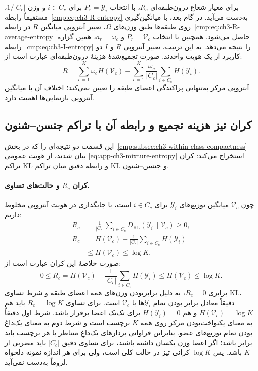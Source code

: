 برای معیار شعاع درون‌طبقه‌ای $R_c$، با انتخاب $P_r=\mathscr Y_i$ برای $i\in C_c$ و وزن $1/|C_c|$، مستقیماً رابطه~\eqref{cmp:eq:ch3-R-entropy} به‌دست می‌آید. در گام بعد، با میانگین‌گیری روی طبقه‌ها طبق وزن‌های $\Omega$، تعبیر آنتروپی میانگین $R$ در رابطه~\eqref{cmp:eq:ch3-R-average-entropy} حاصل می‌شود. همچنین با انتخاب $P_r=\mathcal V_c$ و $a_r=\omega_c$، همین گزاره رابطه~\eqref{cmp:eq:ch3-I-entropy} را نتیجه می‌دهد. به این ترتیب، تعبیر آنتروپی $R$ و $I$ دو کاربرد از یک هویت واحدند. صورت تجمیع‌شدهٔ هزینهٔ درون‌طبقه‌ای عبارت است از:
\begin{equation}\label{cmp:eq:ch3-R-average-entropy}
\boxed{R=\sum_{c=1}^{K}\omega_c H(\mathcal V_c)
-\sum_{c=1}^{K}\frac{\omega_c}{|C_c|}
\sum_{i\in C_c}H(\mathscr Y_i).}
\end{equation}
آنتروپی مرکز به‌تنهایی پراکندگی اعضای طبقه را تعیین نمی‌کند؛ اختلاف آن با میانگین آنتروپی بازنمایی‌ها اهمیت دارد.

\subsection{کران تیز هزینه تجمیع و رابطه آن با تراکم جنسن--شنون}
\label{app:ch3-compactness-entropy-relations}
این قسمت دو نتیجه‌ای را که در
بخش~\ref{cmp:subsec:ch3-within-class-compactness}
بیان شدند، از هویت عمومی
\eqref{eq:app-ch3-mixture-entropy}
استخراج می‌کند: کران تراکم KL
و رابطه دقیق میان تراکم KL و جنسن--شنون.

\paragraph{کران $R_c$ و حالت‌های تساوی.}
چون $\mathcal V_c$ میانگین توزیع‌های
$\mathscr Y_i$ برای $i\in C_c$ است،
با جایگذاری در هویت آنتروپی مخلوط داریم:
\begin{equation}\label{eq:app-ch3-R-entropy-bound-proof}
\begin{aligned}
R_c
&=\frac1{|C_c|}\sum_{i\in C_c}
D_{\mathrm{KL}}(\mathscr Y_i\|\mathcal V_c)
\ge0,\\
R_c
&=H(\mathcal V_c)-\frac1{|C_c|}
\sum_{i\in C_c}H(\mathscr Y_i)\\
&\le H(\mathcal V_c)\le\log K.
\end{aligned}
\end{equation}
صورت خلاصهٔ این کران عبارت است از:
\begin{equation}\label{cmp:eq:ch3-R-KL-bounds}
\boxed{
0\le R_c
=H(\mathcal V_c)
-\frac1{|C_c|}\sum_{i\in C_c}H(\mathscr Y_i)
\le H(\mathcal V_c)\le\log K.
}
\end{equation}
برابری $R_c=0$، به دلیل برابربودن
وزن‌های همه اعضای طبقه و شرط تساوی KL،
دقیقاً معادل برابر بودن تمام
$\mathscr Y_i$ها با $\mathcal V_c$ است.
برای تساوی $R_c=\log K$ باید هم
$H(\mathcal V_c)=\log K$ و هم
$H(\mathscr Y_i)=0$ برای تک‌تک اعضا
برقرار باشد. شرط اول دقیقاً به معنای
یکنواخت‌بودن مرکز روی همه $K$ برچسب است
و شرط دوم به معنای یک‌داغ بودن تمام
توزیع‌های عضو. بنابراین فراوانی
بردارهای یک‌داغِ متناظر با هر برچسب
باید برابر باشد؛ اگر اعضا وزن یکسان
داشته باشند، برای تساوی دقیق
$|C_c|$ باید مضربی از $K$ باشد.
پس $\log K$ کرانی تیز در حالت کلی است،
ولی برای هر اندازه نمونه دلخواه لزوماً
به‌دست نمی‌آید.

